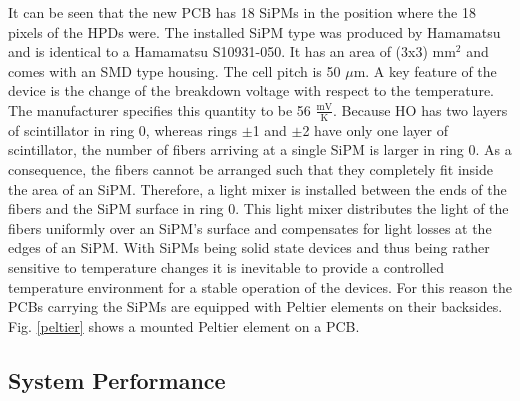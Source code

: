 It can be seen that the new PCB has 18 SiPMs in the position where the 18 pixels of the HPDs were.
The installed SiPM type was produced by Hamamatsu and is identical to a Hamamatsu S10931-050. It has an area of (3x3) mm$^2$ and comes with an SMD type housing. The cell pitch is 50 $\mu$m. A key feature of the device is the change of the breakdown voltage with respect to the temperature. The manufacturer specifies this quantity to be 56 $\frac{\text{mV}}{\text{K}}$.
Because HO has two layers of scintillator in ring 0, whereas rings $\pm$1 and $\pm$2 have only one layer of scintillator, the number of fibers arriving at a single SiPM is larger in ring 0. As a consequence, the fibers cannot be arranged such that they completely fit inside the area of an SiPM. Therefore, a light mixer is installed between the ends of the fibers and the SiPM surface in ring 0. This light mixer distributes the light of the fibers uniformly over an SiPM's surface and compensates for light losses at the edges of an SiPM.
With SiPMs being solid state devices and thus being rather sensitive to temperature changes it is inevitable to provide a controlled temperature environment for a stable operation of the devices. For this reason the PCBs carrying the SiPMs are equipped with Peltier elements on their backsides. Fig. \ref{peltier} shows a mounted Peltier element on a PCB.
\subsection{System Performance}
